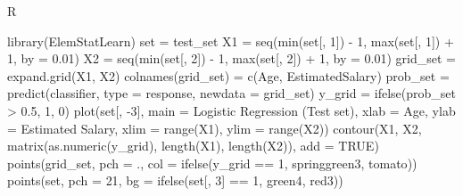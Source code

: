 \documentclass[
]{book}
\newenvironment{Shaded}{\begin{snugshade}}{\end{snugshade}}
\newcommand{\AttributeTok}[1]{\textcolor[rgb]{0.77,0.63,0.00}{#1}}
\newcommand{\ConstantTok}[1]{\textcolor[rgb]{0.00,0.00,0.00}{#1}}
\newcommand{\DecValTok}[1]{\textcolor[rgb]{0.00,0.00,0.81}{#1}}
\newcommand{\FloatTok}[1]{\textcolor[rgb]{0.00,0.00,0.81}{#1}}
\newcommand{\FunctionTok}[1]{\textcolor[rgb]{0.00,0.00,0.00}{#1}}
\newcommand{\NormalTok}[1]{#1}
\newcommand{\OtherTok}[1]{\textcolor[rgb]{0.56,0.35,0.01}{#1}}
\newcommand{\SpecialCharTok}[1]{\textcolor[rgb]{0.00,0.00,0.00}{#1}}
\newcommand{\StringTok}[1]{\textcolor[rgb]{0.31,0.60,0.02}{#1}}
\theoremstyle{definition}
\theoremstyle{definition}
\theoremstyle{definition}
\theoremstyle{definition}
\theoremstyle{remark}
\begin{document}
R

\begin{Shaded}
\begin{Highlighting}[]
\FunctionTok{library}\NormalTok{(ElemStatLearn)}
\NormalTok{set }\OtherTok{=}\NormalTok{ test\_set}
\NormalTok{X1 }\OtherTok{=} \FunctionTok{seq}\NormalTok{(}\FunctionTok{min}\NormalTok{(set[, }\DecValTok{1}\NormalTok{]) }\SpecialCharTok{{-}} \DecValTok{1}\NormalTok{, }\FunctionTok{max}\NormalTok{(set[, }\DecValTok{1}\NormalTok{]) }\SpecialCharTok{+} \DecValTok{1}\NormalTok{, }\AttributeTok{by =} \FloatTok{0.01}\NormalTok{)}
\NormalTok{X2 }\OtherTok{=} \FunctionTok{seq}\NormalTok{(}\FunctionTok{min}\NormalTok{(set[, }\DecValTok{2}\NormalTok{]) }\SpecialCharTok{{-}} \DecValTok{1}\NormalTok{, }\FunctionTok{max}\NormalTok{(set[, }\DecValTok{2}\NormalTok{]) }\SpecialCharTok{+} \DecValTok{1}\NormalTok{, }\AttributeTok{by =} \FloatTok{0.01}\NormalTok{)}
\NormalTok{grid\_set }\OtherTok{=} \FunctionTok{expand.grid}\NormalTok{(X1, X2)}
\FunctionTok{colnames}\NormalTok{(grid\_set) }\OtherTok{=} \FunctionTok{c}\NormalTok{(}\StringTok{\textquotesingle{}Age\textquotesingle{}}\NormalTok{, }\StringTok{\textquotesingle{}EstimatedSalary\textquotesingle{}}\NormalTok{)}
\NormalTok{prob\_set }\OtherTok{=} \FunctionTok{predict}\NormalTok{(classifier, }\AttributeTok{type =} \StringTok{\textquotesingle{}response\textquotesingle{}}\NormalTok{, }\AttributeTok{newdata =}\NormalTok{ grid\_set)}
\NormalTok{y\_grid }\OtherTok{=} \FunctionTok{ifelse}\NormalTok{(prob\_set }\SpecialCharTok{\textgreater{}} \FloatTok{0.5}\NormalTok{, }\DecValTok{1}\NormalTok{, }\DecValTok{0}\NormalTok{)}
\FunctionTok{plot}\NormalTok{(set[, }\SpecialCharTok{{-}}\DecValTok{3}\NormalTok{],}
     \AttributeTok{main =} \StringTok{\textquotesingle{}Logistic Regression (Test set)\textquotesingle{}}\NormalTok{,}
     \AttributeTok{xlab =} \StringTok{\textquotesingle{}Age\textquotesingle{}}\NormalTok{, }\AttributeTok{ylab =} \StringTok{\textquotesingle{}Estimated Salary\textquotesingle{}}\NormalTok{,}
     \AttributeTok{xlim =} \FunctionTok{range}\NormalTok{(X1), }\AttributeTok{ylim =} \FunctionTok{range}\NormalTok{(X2))}
\FunctionTok{contour}\NormalTok{(X1, X2, }\FunctionTok{matrix}\NormalTok{(}\FunctionTok{as.numeric}\NormalTok{(y\_grid), }\FunctionTok{length}\NormalTok{(X1), }\FunctionTok{length}\NormalTok{(X2)), }\AttributeTok{add =} \ConstantTok{TRUE}\NormalTok{)}
\FunctionTok{points}\NormalTok{(grid\_set, }\AttributeTok{pch =} \StringTok{\textquotesingle{}.\textquotesingle{}}\NormalTok{, }\AttributeTok{col =} \FunctionTok{ifelse}\NormalTok{(y\_grid }\SpecialCharTok{==} \DecValTok{1}\NormalTok{, }\StringTok{\textquotesingle{}springgreen3\textquotesingle{}}\NormalTok{, }\StringTok{\textquotesingle{}tomato\textquotesingle{}}\NormalTok{))}
\FunctionTok{points}\NormalTok{(set, }\AttributeTok{pch =} \DecValTok{21}\NormalTok{, }\AttributeTok{bg =} \FunctionTok{ifelse}\NormalTok{(set[, }\DecValTok{3}\NormalTok{] }\SpecialCharTok{==} \DecValTok{1}\NormalTok{, }\StringTok{\textquotesingle{}green4\textquotesingle{}}\NormalTok{, }\StringTok{\textquotesingle{}red3\textquotesingle{}}\NormalTok{))}
\end{Highlighting}
\end{Shaded}
\end{document}
